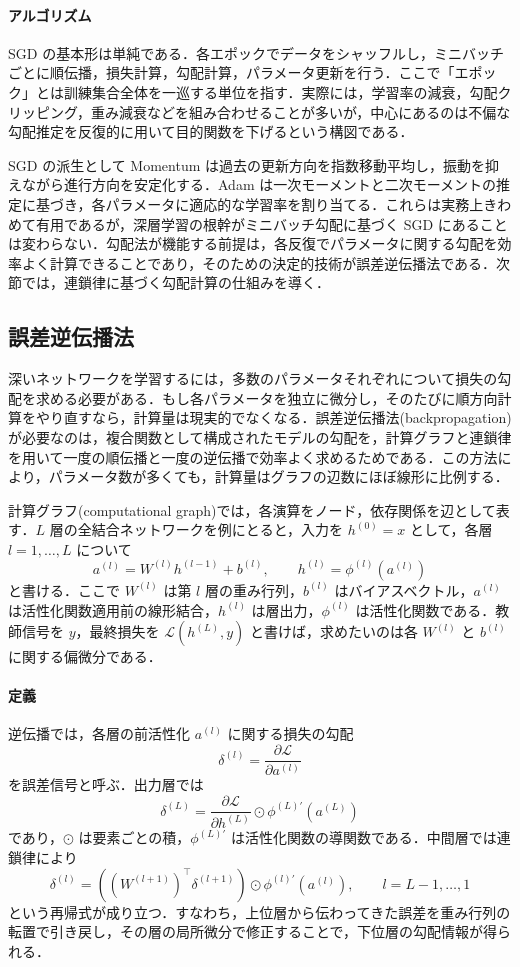 \paragraph*{アルゴリズム}
SGD の基本形は単純である．各エポックでデータをシャッフルし，ミニバッチごとに順伝播，損失計算，勾配計算，パラメータ更新を行う．ここで「エポック」とは訓練集合全体を一巡する単位を指す．実際には，学習率の減衰，勾配クリッピング，重み減衰などを組み合わせることが多いが，中心にあるのは不偏な勾配推定を反復的に用いて目的関数を下げるという構図である．

SGD の派生として Momentum は過去の更新方向を指数移動平均し，振動を抑えながら進行方向を安定化する．Adam は一次モーメントと二次モーメントの推定に基づき，各パラメータに適応的な学習率を割り当てる．これらは実務上きわめて有用であるが，深層学習の根幹がミニバッチ勾配に基づく SGD にあることは変わらない．勾配法が機能する前提は，各反復でパラメータに関する勾配を効率よく計算できることであり，そのための決定的技術が誤差逆伝播法である．次節では，連鎖律に基づく勾配計算の仕組みを導く．

\subsection{誤差逆伝播法}
深いネットワークを学習するには，多数のパラメータそれぞれについて損失の勾配を求める必要がある．もし各パラメータを独立に微分し，そのたびに順方向計算をやり直すなら，計算量は現実的でなくなる．誤差逆伝播法(backpropagation)が必要なのは，複合関数として構成されたモデルの勾配を，計算グラフと連鎖律を用いて一度の順伝播と一度の逆伝播で効率よく求めるためである．この方法により，パラメータ数が多くても，計算量はグラフの辺数にほぼ線形に比例する．

計算グラフ(computational graph)では，各演算をノード，依存関係を辺として表す．$L$ 層の全結合ネットワークを例にとると，入力を $h^{(0)}=x$ として，各層 $l=1,\dots,L$ について
\[
a^{(l)} = W^{(l)} h^{(l-1)} + b^{(l)},
\qquad
h^{(l)} = \phi^{(l)}(a^{(l)})
\]
と書ける．ここで $W^{(l)}$ は第 $l$ 層の重み行列，$b^{(l)}$ はバイアスベクトル，$a^{(l)}$ は活性化関数適用前の線形結合，$h^{(l)}$ は層出力，$\phi^{(l)}$ は活性化関数である．教師信号を $y$，最終損失を $\mathcal L(h^{(L)},y)$ と書けば，求めたいのは各 $W^{(l)}$ と $b^{(l)}$ に関する偏微分である．

\paragraph*{定義}
逆伝播では，各層の前活性化 $a^{(l)}$ に関する損失の勾配
\[
\delta^{(l)} = \frac{\partial \mathcal L}{\partial a^{(l)}}
\]
を誤差信号と呼ぶ．出力層では
\[
\delta^{(L)}
= \frac{\partial \mathcal L}{\partial h^{(L)}} \odot \phi^{(L)\prime}(a^{(L)})
\]
であり，$\odot$ は要素ごとの積，$\phi^{(L)\prime}$ は活性化関数の導関数である．中間層では連鎖律により
\[
\delta^{(l)}
= \left((W^{(l+1)})^\top \delta^{(l+1)}\right)\odot \phi^{(l)\prime}(a^{(l)}),
\qquad l=L-1,\dots,1
\]
という再帰式が成り立つ．すなわち，上位層から伝わってきた誤差を重み行列の転置で引き戻し，その層の局所微分で修正することで，下位層の勾配情報が得られる．

